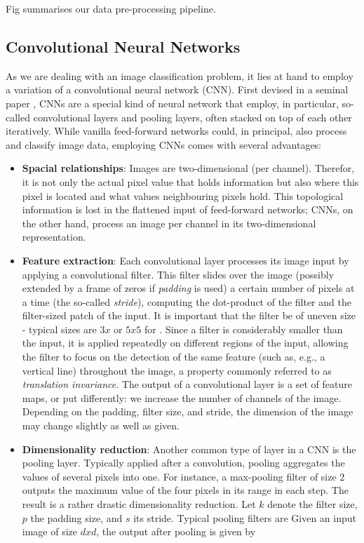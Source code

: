 \documentclass[british,12p]{article}
\begin{document}
    	Fig summarises our data pre-processing pipeline. 
    	
    	
    \subsection{Convolutional Neural Networks}
    As we are dealing with an image classification problem, it lies at hand to employ a variation of a convolutional neural network (CNN). First devised in a seminal paper , CNNs are a special kind of neural network that employ, in particular, so-called convolutional layers and pooling layers, often stacked on top of each other iteratively. While vanilla feed-forward networks could, in principal, also process and classify image data, employing CNNs comes with several advantages:
    \begin{itemize}
    	\item \textbf{Spacial relationships}: Images are two-dimensional	(per channel). Therefor, it is not only the actual pixel value that holds information but also where this pixel is located and what values neighbouring pixels hold. This topological information is lost in the flattened input of feed-forward networks; CNNs, on the other hand, process an image per channel in its two-dimensional representation. 
    	\item \textbf{Feature extraction}: Each convolutional layer processes its image input by applying a convolutional filter. This filter slides over the image (possibly extended by a frame of zeros if \textit{padding} is used) a certain number of pixels at a time (the so-called \textit{stride}), computing the dot-product of the filter and the filter-sized patch of the input. It is important that the filter be of uneven size - typical sizes are $3x$ or $5x5$ for . Since a filter is considerably smaller than the input, it is applied repeatedly on different regions of the input, allowing the filter to focus on the detection of the same feature (such as, e.g., a vertical line) throughout the image, a property commonly referred to as \textit{translation invariance}. The output of a convolutional layer is a set of feature maps, or put differently: we increase the number of channels of the image. Depending on the padding, filter size, and stride, the dimension of the image may change slightly as well as given.
    	\item \textbf{Dimensionality reduction}: Another common type of layer in a CNN is the pooling layer. Typically applied after a convolution, pooling aggregates the values of several pixels into one. For instance, a max-pooling filter of size 2 outputs the maximum value of the four pixels in its range in each step. The result is a rather drastic dimensionality reduction. Let $k$ denote the filter size, $p$ the padding size, and $s$ its stride. Typical pooling filters are Given an input image of size $dxd$, the output after pooling is given by

\end{itemize}
\end{document}
